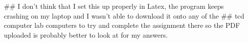 	
## I don't think that I set this up properly in Latex, the program keeps crashing on my laptop and I wasn't able to download it onto any of the 
## tcd computer lab computers to try and complete the assignment there so the PDF uploaded is probably better to look at for my answers. 
	
	
	
	
	
	
	
	